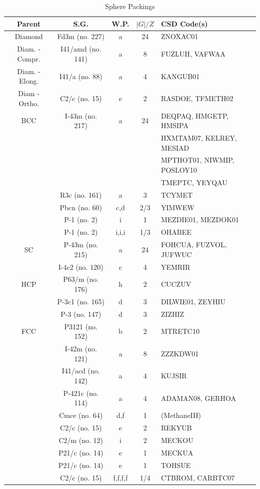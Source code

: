 \documentclass[preprint]{iucr}              %
\begin{document}
\begin{table}
\label{tab_sphere}
\caption{Sphere Packings}
\begin{tabular}{ccccl} %
Parent & S.G. & W.P. & $|G|/Z$& CSD Code(s) \\
\hline
Diamond 	& Fd3m (no. 227) & a 	& 24 	& ZNOXAC01 \\
Diam. - Compr. & I41/amd (no. 141) & a & 8	& FUZLUH, VAFWAA \\
Diam. - Elong.	& I41/a	(no. 88)	 & a 	& 4	& KANGUB01 \\
Diam - Ortho.	& C2/c (no. 15) & e	& 2	& RASDOE, TFMETH02 \\
BCC		& I-43m (no. 217) & a 	& 24 	& DEQPAQ, HMGETP, HMSIPA \\
&		&	& 	& HXMTAM07, KELREY, MESIAD \\
&		&	& 	& MPTHOT01, NIWMIP, POSLOY10 \\
&		&	& 	& TMEPTC, YEYQAU \\
& R3c (no. 161) & a	& 3	& TCYMET \\
& Pbcn (no. 60) & c,d	& 2/3	& YIMWEW \\
& P-1 (no. 2) & i	& 1	& MEZDIE01, MEZDOK01 \\
& P-1 (no. 2) & i,i,i	& 1/3	& OHABEE \\
SC		& P-43m (no. 215) & a 	& 24 	& FOHCUA, FUZVOL, JUFWUC \\
		& I-4c2 (no. 120) & c	& 4	& YEMRIR \\
HCP		& P63/m (no. 176) & h	& 2	& CUCZUV \\
		& P-3c1 (no. 165) & d	& 3	& DILWIE01, ZEYHIU \\
		& P-3 (no. 147) & d	& 3	& ZIZHIZ \\
FCC		& P3121 (no. 152) & b	& 2	& MTRETC10 \\
		& I-42m (no. 121) & a	& 8	& ZZZKDW01 \\
		& I41/acd (no. 142) & a & 4	& KUJSIR \\
		& P-421c (no. 114) & a	& 4	& ADAMAN08, GERHOA \\
		& Cmce (no. 64) & d,f	& 1	& (MethaneIII) \\
		& C2/c (no. 15) & e	& 2	& REKYUB \\
		& C2/m (no. 12) & i	& 2	& MECKOU \\
		& P21/c (no. 14) & e	& 1	& MECKUA \\
		& P21/c (no. 14) & e	& 1	& TOHSUE \\
		& C2/c (no. 15)	& f,f,f,f	& 1/4	& CTBROM, CARBTC07 \\
\hline
\end{tabular}
\end{table}
\end{document}

